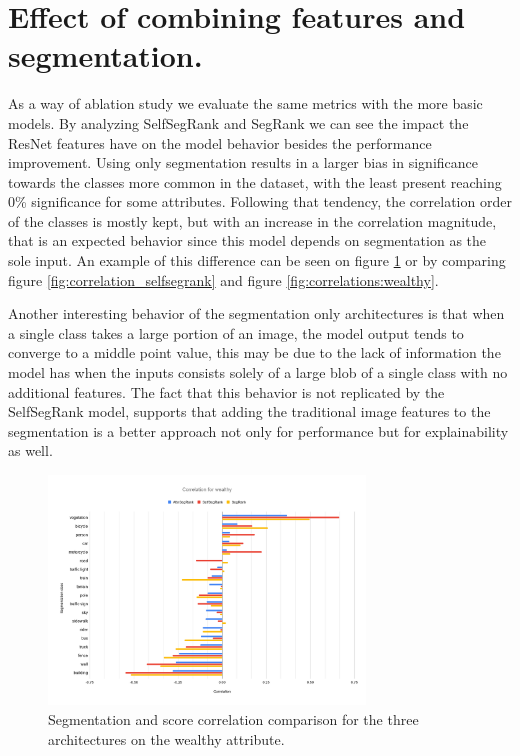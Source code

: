 \section{Effect of combining features and segmentation.}

As a way of ablation study we evaluate the same metrics with the more basic models.
By analyzing SelfSegRank and SegRank we can see the impact the ResNet features have on the model  behavior
besides the performance improvement.
Using only segmentation results in a larger bias in significance towards the classes more
common in the dataset, with the least present reaching 0\% significance for some attributes.
Following that tendency, the correlation order of the classes is mostly kept, but with an
increase in the correlation magnitude, that is an expected behavior since this model depends on segmentation as
the sole input. An example of this difference can be seen on figure \ref{fig:correlation_comparison}  or
by comparing figure \ref{fig:correlation_selfsegrank} and figure \ref{fig:correlations:wealthy}.

Another interesting behavior of the segmentation only architectures is
that when a single class takes a large portion of an image,
the model output tends to converge to a middle point value, this may be due to the lack of
information the model has when the inputs consists solely of a large  blob of a single class with no
additional features. The fact that this behavior is not replicated by the SelfSegRank model, supports
that adding the traditional image features to the segmentation is a better approach not only for performance
but for explainability as well.

\begin{figure}[ht]
	\begin{center}
	\includegraphics[width=0.75\textwidth]{./figures/correlation_comparison.png}
	\caption[Correlation comparison]{
		Segmentation and score correlation comparison for the three architectures on the wealthy
		attribute.
        }
	\label{fig:correlation_comparison}
	\end{center}
\end{figure}

